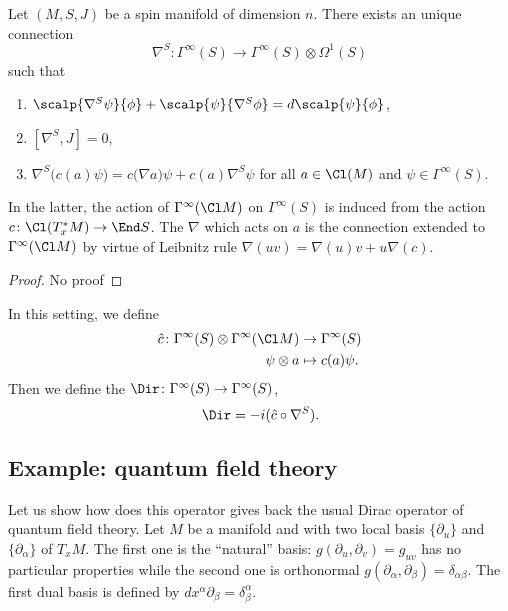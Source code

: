 \begin{theorem}
Let $(M,S,J)$ be a spin manifold of dimension $n$. There exists an unique connection
\[
  \nabla^S\colon \Gamma^{\infty}(S)\to \Gamma^{\infty}(S)\otimes\Omega^1(S)
\]
such that
\begin{enumerate}
\item $\scalp{ \nabla^S\psi }{ \phi }+\scalp{ \psi }{ \nabla^S\phi }=d\scalp{ \psi }{ \phi }$,
\item $[\nabla^S,J]=0$,
\item $\nabla^S\big( c(a)\psi \big)=c\big( \nabla a \big)\psi+c(a)\nabla^S\psi$ for all $a\in\Cl(M)$ and $\psi\in\Gamma^{\infty}(S)$.
\end{enumerate}
In the latter, the action of $\Gamma^{\infty}(\Cl M)$ on $\Gamma^{\infty}(S)$ is induced from the action $c\colon \Cl(T^*_xM)\to \End S$. The $\nabla$ which acts on $a$ is the connection extended to $\Gamma^{\infty}(\Cl M)$ by virtue of Leibnitz rule $\nabla(uv)=\nabla(u)v+u\nabla(c)$.

\end{theorem}

\begin{proof}
No proof
\end{proof}


In this setting, we define
\begin{equation}
\begin{aligned}
 \hat c\colon\Gamma^{\infty}(S)\otimes\Gamma^{\infty}(\Cl M)&\to \Gamma^{\infty}(S) \\
 \psi\otimes a&\mapsto c(a)\psi.
\end{aligned}
\end{equation}
Then we define the  $\Dir\colon \Gamma^{\infty}(S)\to \Gamma^{\infty}(S)$,
\begin{equation}
  \Dir=-i(\hat c\circ\nabla^S).
\end{equation}

\subsection{Example: quantum field theory}

Let us show how does this operator gives back the usual Dirac operator of quantum field theory. Let $M$ be a manifold and with two local basis $\{ \partial_u \}$ and $\{ \partial_{\alpha} \}$ of $T_xM$. The first one is the ``natural'' basis: $g(\partial_u,\partial_v)=g_{uv}$ has no particular properties while the second one is orthonormal $g(\partial_{\alpha},\partial_{\beta})=\delta_{\alpha\beta}$. The first dual basis is defined by $dx^{\alpha}\partial_{\beta}=\delta^{\alpha}_{\beta}$.

